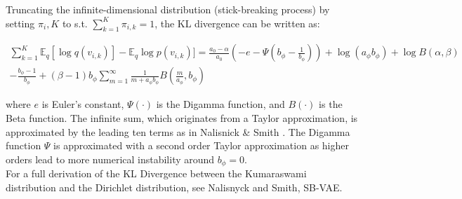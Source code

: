 \documentclass{report}
\begin{document}
Truncating the infinite-dimensional distribution (stick-breaking process) by setting $\pi_i,K$ to s.t. $\sum_{k=1}^{K}\pi_{i,k} = 1$, the KL divergence can be written as:

\begin{align*}
\sum_{k=1}^{K}\mathbb{E}_q [\log q(v_{i,k})] - \mathbb{E}_q \log p(v_{i,k})] = \frac{a_0 -\alpha}{a_0}(-e-\Psi(b_\phi-\frac{1}{b_\phi}))+ \log(a_\phi b_\phi) + \log B(\alpha, \beta) \\
- \frac{b_\phi -1}{b_\phi} 
+ (\beta-1)b_\phi\sum_{m=1}^{\infty}\frac{1}{m+a_\phi b_\phi}B(\frac{m}{a_\phi},b_\phi)
\end{align*}

where $e$ is Euler’s constant, $\Psi(\cdot)$ is the Digamma function, and $B(\cdot)$ is the Beta function.
The infinite sum, which originates from a Taylor approximation, is approximated by the leading ten terms as in Nalisnick \& Smith \cite{nalisnick2016deep}. The Digamma function $\Psi$ is approximated with a second order Taylor approximation as higher orders lead to more numerical instability around $b_\phi = 0$. \\
For a full derivation of the KL Divergence between the Kumaraswami distribution and the Dirichlet distribution, see Nalisnyck and Smith, SB-VAE.\\
\end{document}
